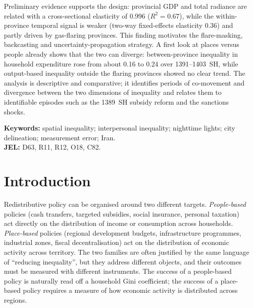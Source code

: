 \documentclass[11pt,a4paper]{article}
\begin{document}
{Preliminary evidence supports the design: provincial GDP and total radiance are related with a cross-sectional elasticity of 0.996 ($R^2=0.67$), while the within-province temporal signal is weaker (two-way fixed-effects elasticity 0.36) and partly driven by gas-flaring provinces. This finding motivates the flare-masking, backcasting and uncertainty-propagation strategy. A first look at places versus people already shows that the two can diverge: between-province inequality in household expenditure rose from about 0.16 to 0.24 over 1391--1403~SH, while output-based inequality outside the flaring provinces showed no clear trend. The analysis is descriptive and comparative; it identifies periods of co-movement and divergence between the two dimensions of inequality and relates them to identifiable episodes such as the 1389~SH subsidy reform and the sanctions shocks.

\medskip
\noindent\textbf{Keywords:} spatial inequality; interpersonal inequality; nighttime lights; city delineation; measurement error; Iran.\\
\textbf{JEL:} D63, R11, R12, O18, C82.
}

\newpage
\setcounter{tocdepth}{2}
\begingroup\setlength{\parskip}{0pt}\small
\tableofcontents
\endgroup
\newpage
{}
\setcounter{page}{1}

\section{Introduction}\label{sec:intro}

Redistributive policy can be organised around two different targets. \emph{People-based} policies (cash transfers, targeted subsidies, social insurance, personal taxation) act directly on the distribution of income or consumption across households. \emph{Place-based} policies (regional development budgets, infrastructure programmes, industrial zones, fiscal decentralisation) act on the distribution of economic activity across territory. The two families are often justified by the same language of ``reducing inequality'', but they address different objects, and their outcomes must be measured with different instruments. The success of a people-based policy is naturally read off a household Gini coefficient; the success of a place-based policy requires a measure of how economic activity is distributed across regions.
\end{document}
